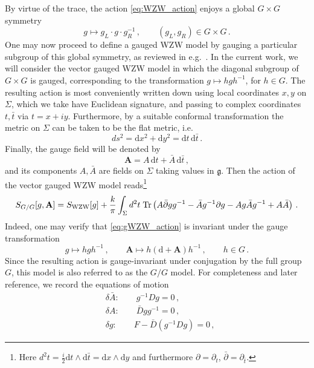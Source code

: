 \documentclass[11pt,a4paper]{article}
\numberwithin{equation}{section}
\numberwithin{table}{section}\setlength{\multlinegap}{25pt}
\newcommand{\dd}{\mathrm{d}}
\begin{document}
By virtue of the trace, the action \eqref{eq:WZW_action} enjoys a global $G\times G$ symmetry 
\begin{equation}
\label{eq:global_symmetry}
	g\mapsto g_L\cdot g\cdot g_R^{-1}\,,\qquad (g_L, g_R) \in G\times G\,.
\end{equation}
One may now proceed to define a gauged WZW model by gauging a particular subgroup of this global symmetry, as reviewed in e.g.~\cite{Chung:1993}. In the current work, we will consider the vector gauged WZW model in which the diagonal subgroup of $G\times G$ is gauged, corresponding to the transformation $g\mapsto hgh^{-1}$, for $h\in G$. The resulting action is most conveniently written down using local coordinates $x,y$ on $\Sigma$, which we take have Euclidean signature, and passing to complex coordinates $t,\bar{t}$ via $t=x+iy$. Furthermore, by a suitable conformal transformation the metric on $\Sigma$ can be taken to be the flat metric, i.e.
\begin{equation}
	ds^2 = \dd x^2+\dd y^2 = \dd t\,\dd \bar{t}\,.
\end{equation}
Finally, the gauge field will be denoted by
\begin{equation}
	\mathbf{A} = A\,\dd t+\bar{A}\,\dd\bar{t}\,,
\end{equation}
and its components $A,\bar{A}$ are fields on $\Sigma$ taking values in $\mathfrak{g}$. Then the action of the vector gauged WZW model reads\footnote{Here $d^2t = \frac{i}{2}\dd t\wedge \dd \bar{t}=\dd x\wedge \dd y$ and furthermore $\partial = \partial_t$, $\bar{\partial} = \partial_{\bar{t}}$.} \cite{Gawedzki:1988_I,Gawedzki:1988_II,Witten:1991}
\begin{equation}
\label{eq:gWZW_action}
S_{G/G}[g,\mathbf{A}] = S_{\mathrm{WZW}}[g]+\frac{k}{\pi}\int_\Sigma d^2t\;\mathrm{Tr}\left(A\Bar{\partial}g g^{-1}-\bar{A}g^{-1}\partial g -Ag\Bar{A}g^{-1}+A\Bar{A} \right)\,.
\end{equation}
Indeed, one may verify that \eqref{eq:gWZW_action} is invariant under the gauge transformation
\begin{equation}
	g\mapsto hgh^{-1}\,,\qquad \mathbf{A}\mapsto h\left(\dd+\mathbf{A}\right)h^{-1}\,,\qquad h\in G\,.
\end{equation}
Since the resulting action is gauge-invariant under conjugation by the full group $G$, this model is also referred to as the $G/G$ model. For completeness and later reference, we record the equations of motion 
\begin{align}
\label{eq:eom_gWZW_barA}	&\delta\bar{A}:\qquad g^{-1}Dg = 0\,, \\
	&\delta A:\qquad \bar{D}g g^{-1}=0\,, \\
\label{eq:eom_gWZW_g}	&\delta g:\qquad F-\bar{D}(g^{-1}Dg)=0\,, 
\end{align}
\end{document}
